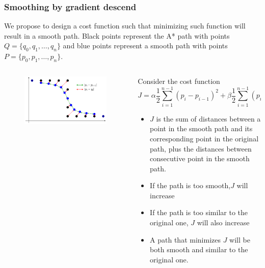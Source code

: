 \begin{frame}\frametitle{Smoothing by gradient descend}
  We propose to design a cost function such that minimizing such function will result in a smooth path. Black points represent the A* path with points $Q=\{q_0, q_1, \dots, q_n\}$ and blue points represent a smooth path with points $P=\{p_0, p_1,\dots, p_n\}$.
  \begin{columns}
    \begin{column}{0.5\textwidth}
      \begin{figure}
        \centering
        \includegraphics[width=\textwidth]{Figures/MotionPlanning/PathSmoothing.pdf}
      \end{figure}
    \end{column}
    \begin{column}{0.5\textwidth}
      Consider the cost function
      \[J = \alpha\frac{1}{2}\sum_{i=1}^{n-1}\left(p_i - p_{i-1}\right)^2 + \beta\frac{1}{2}\sum_{i=1}^{n-1}(p_i - q_i)^2\]
      \begin{itemize}
      \item $J$ is the sum of distances between a point in the smooth path and its corresponding point in the original path, plus the distances between consecutive point in the smooth path. 
      \item If the path is too smooth,$J$ will increase
      \item If the path is too similar to the original one, $J$ will also increase
      \item A path that minimizes $J$ will be both smooth and similar to the original one. 
      \end{itemize}
    \end{column}
  \end{columns}
\end{frame}

